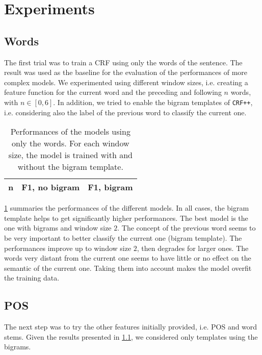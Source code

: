 \section{Experiments}
\label{sec:experiments}

\subsection{Words}
\label{subsection:words}
The first trial was to train a \ac{CRF} using only the words of the sentence.
The result was used as the baseline for the evaluation of the performances of more complex models.
We experimented using different window sizes, i.e. creating a feature function for the current word and the preceding and following $n$ words, with $n \in [0,6]$.
In addition, we tried to enable the bigram templates of \texttt{CRF++}, i.e. considering also the label of the previous word to classify the current one. 

\begin{table}[h]
	\centering
    \begin{tabular}{ c c c }
    	\toprule
    		\multicolumn{1}{c}{n} & \multicolumn{1}{c}{F1, no bigram} & \multicolumn{1}{c}{F1, bigram} \\
    	\midrule
            
    	\bottomrule
	\end{tabular}
    \caption{Performances of the models using only the words. For each window size, the model is trained with and without the bigram template.}
	\label{tab:words}
\end{table}

\cref{tab:words} summaries the performances of the different models.
In all cases, the bigram template helps to get significantly higher performances.
The best model is the one with bigrams and window size $2$.
The concept of the previous word seems to be very important to better classify the current one (bigram template).
The performances improve up to window size $2$, then degrades for larger ones.
The words very distant from the current one seems to have little or no effect on the semantic of the current one.
Taking them into account makes the model overfit the training data.

\subsection{POS}
\label{subsection:pos}
The next step was to try the other features initially provided, i.e. \ac{POS} and word stems.
Given the results presented in \cref{subsection:words}, we considered only templates using the bigrams.

